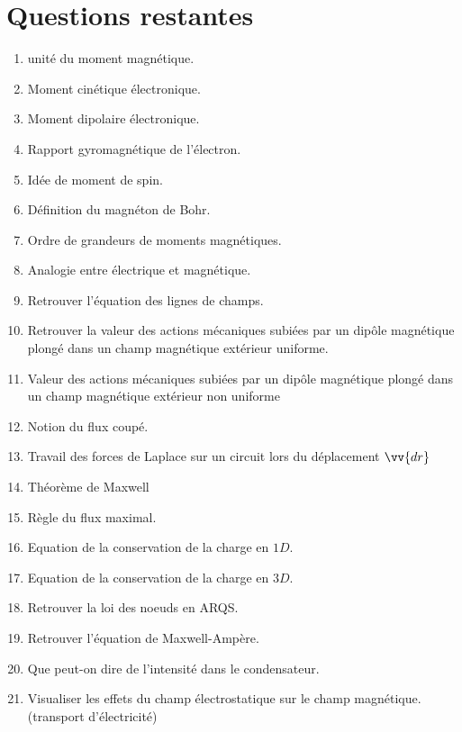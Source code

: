 \documentclass[a4paper, 11pt, hidelinks]{article}
\begin{document}
\section{Questions restantes}
\begin{enumerate}
    \item unité du moment magnétique. \cite{Chapitre12}
    \item Moment cinétique électronique. \cite{Chapitre12}
    \item Moment dipolaire électronique. \cite{Chapitre12}
    \item Rapport gyromagnétique de l'électron. \cite{Chapitre12}
    \item Idée de moment de spin. \cite{Chapitre12}
    \item Définition du magnéton de Bohr. \cite{Chapitre12}
    \item Ordre de grandeurs de moments magnétiques. \cite{Chapitre12}
    \item Analogie entre électrique et magnétique. \cite{Chapitre12}
    \item Retrouver l'équation des lignes de champs. \cite{Chapitre12}
    \item Retrouver la valeur des actions mécaniques subiées par un dipôle magnétique plongé dans un champ magnétique extérieur uniforme. \cite{Chapitre12}
    \item Valeur des actions mécaniques subiées par un dipôle magnétique plongé dans un champ magnétique extérieur non uniforme \cite{Chapitre12}
    \item Notion du flux coupé. \cite{Chapitre12}
    \item Travail des forces de Laplace sur un circuit lors du déplacement $\vv{dr}$ \cite{Chapitre12}
    \item Théorème de Maxwell \cite{Chapitre12}
    \item Règle du flux maximal. \cite{Chapitre12}
    \item Equation de la conservation de la charge en $1D$. \cite{Chapitre13}
    \item Equation de la conservation de la charge en $3D$. \cite{Chapitre13}
    \item Retrouver la loi des noeuds en ARQS. \cite{Chapitre13}
    \item Retrouver l'équation de Maxwell-Ampère. \cite{Chapitre13}
    \item Que peut-on dire de l'intensité dans le condensateur. \cite{Chapitre13}
    \item Visualiser les effets du champ électrostatique sur le champ magnétique. (transport d'électricité) \cite{Chapitre13}

\end{enumerate}
\end{document}
